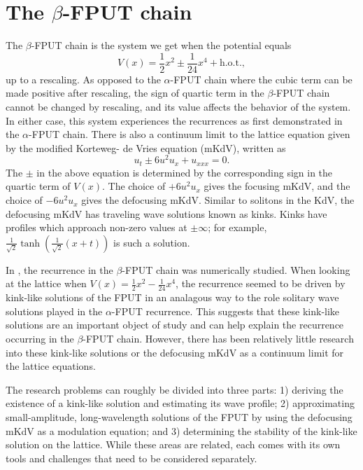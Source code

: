 \section{The \(\beta\)-FPUT chain}

The \(\beta\)-FPUT chain is the system we get when the potential equals
\begin{equation*}
	V(x) = \frac 12 x^2 \pm \frac 1 {24}x^4 + \text{h.o.t.},
\end{equation*}
up to a rescaling. As opposed to the \(\alpha\)-FPUT chain where the cubic term can be made positive after rescaling, the sign of quartic term in the \(\beta\)-FPUT chain cannot be changed by rescaling, and its value affects the behavior of the system. In either case, this system  experiences the recurrences as first demonstrated in the \(\alpha\)-FPUT chain. There is also a continuum limit to the lattice equation given by the modified Korteweg- de Vries equation (mKdV), written as
\begin{equation*}
	u_t \pm 6 u^2 u_x + u_{xxx} = 0.
\end{equation*}
The \(\pm\) in the above equation is determined by the corresponding sign in the quartic term of \(V(x)\). The choice of \(+6u^2u_x\) gives the focusing mKdV, and the choice of \(-6u^2u_x\) gives the defocusing mKdV. Similar to solitons in the KdV, the defocusing mKdV has traveling wave solutions known as kinks. Kinks have profiles which approach non-zero values at \(\pm \infty\); for example, \(\frac 1 {\sqrt 2} \tanh(\frac 1 {\sqrt 2} (x+t))\) is such a solution.

In \cite{pace2019beta}, the recurrence in the \(\beta\)-FPUT chain was numerically studied. When looking at the lattice when \(V(x) = \frac  12 x^2 - \frac 1 {24}x^4\), the recurrence seemed to be driven by kink-like solutions of the FPUT in an analagous way to the role solitary wave solutions played in the \(\alpha\)-FPUT recurrence. This suggests that these kink-like solutions are an important object of study and can help explain the recurrence occurring in the \(\beta\)-FPUT chain. However, there has been relatively little research into these kink-like solutions or the defocusing mKdV as a continuum limit for the lattice equations. 

The research problems can roughly be divided into three parts: 1) deriving the existence of a kink-like solution and estimating its wave profile; 2) approximating small-amplitude, long-wavelength solutions of the FPUT by using the defocusing mKdV as a modulation equation; and 3) determining the stability of the kink-like solution on the lattice. While these areas are related, each comes with its own tools and challenges that need to be considered separately. 


